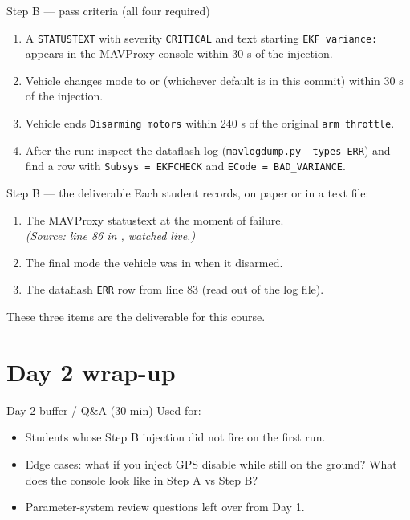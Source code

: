 \documentclass[aspectratio=169,11pt]{beamer}
\begin{document}
\begin{frame}{Step B --- pass criteria (all four required)}
  \begin{enumerate}
    \item A \texttt{STATUSTEXT} with severity \texttt{CRITICAL} and text starting \texttt{EKF variance:} appears in the MAVProxy console within 30 s of the injection.
    \item Vehicle changes mode to  or  (whichever  default is in this commit) within 30 s of the injection.
    \item Vehicle ends \texttt{Disarming motors} within 240 s of the original \texttt{arm throttle}.
    \item After the run: inspect the dataflash log (\texttt{mavlogdump.py --types ERR}) and find a row with \texttt{Subsys = EKFCHECK} and \texttt{ECode = BAD\_VARIANCE}.
  \end{enumerate}
\end{frame}

\begin{frame}{Step B --- the deliverable}
  Each student records, on paper or in a text file:
  \begin{enumerate}
    \item The MAVProxy statustext at the moment of failure.\\
      \emph{(Source: line 86 in , watched live.)}
    \item The final mode the vehicle was in when it disarmed.
    \item The dataflash \texttt{ERR} row from line 83 (read out of the log file).
  \end{enumerate}
  These three items are the deliverable for this course.
\end{frame}

\section{Day 2 wrap-up}

\begin{frame}{Day 2 buffer / Q\&A (30 min)}
  Used for:
  \begin{itemize}
    \item Students whose Step B injection did not fire on the first run.
    \item Edge cases: what if you inject GPS disable while still on the ground? What does the console look like in Step A vs Step B?
    \item Parameter-system review questions left over from Day 1.
  \end{itemize}
\end{frame}
\end{document}

